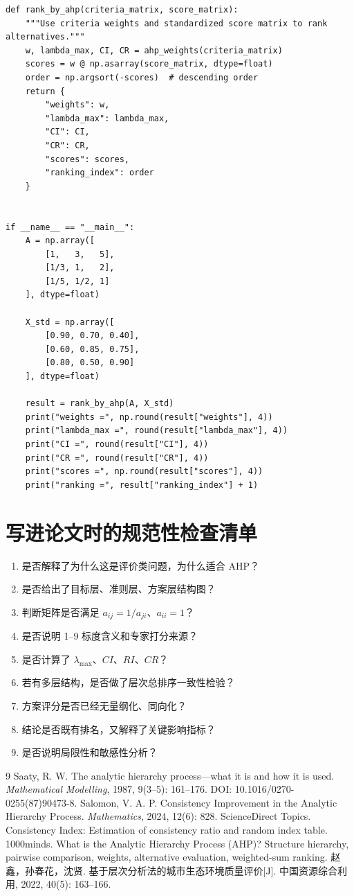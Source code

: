 \documentclass[UTF8,zihao=-4,fontset=none]{ctexart}
\begin{document}
\begin{lstlisting}
def rank_by_ahp(criteria_matrix, score_matrix):
    """Use criteria weights and standardized score matrix to rank alternatives."""
    w, lambda_max, CI, CR = ahp_weights(criteria_matrix)
    scores = w @ np.asarray(score_matrix, dtype=float)
    order = np.argsort(-scores)  # descending order
    return {
        "weights": w,
        "lambda_max": lambda_max,
        "CI": CI,
        "CR": CR,
        "scores": scores,
        "ranking_index": order
    }


if __name__ == "__main__":
    A = np.array([
        [1,   3,   5],
        [1/3, 1,   2],
        [1/5, 1/2, 1]
    ], dtype=float)

    X_std = np.array([
        [0.90, 0.70, 0.40],
        [0.60, 0.85, 0.75],
        [0.80, 0.50, 0.90]
    ], dtype=float)

    result = rank_by_ahp(A, X_std)
    print("weights =", np.round(result["weights"], 4))
    print("lambda_max =", round(result["lambda_max"], 4))
    print("CI =", round(result["CI"], 4))
    print("CR =", round(result["CR"], 4))
    print("scores =", np.round(result["scores"], 4))
    print("ranking =", result["ranking_index"] + 1)
\end{lstlisting}

\section{写进论文时的规范性检查清单}
\begin{enumerate}[leftmargin=2.2em]
  \item 是否解释了为什么这是评价类问题，为什么适合 AHP？
  \item 是否给出了目标层、准则层、方案层结构图？
  \item 判断矩阵是否满足 $a_{ij}=1/a_{ji}$、$a_{ii}=1$？
  \item 是否说明 1--9 标度含义和专家打分来源？
  \item 是否计算了 $\lambda_{\max}$、$CI$、$RI$、$CR$？
  \item 若有多层结构，是否做了层次总排序一致性检验？
  \item 方案评分是否已经无量纲化、同向化？
  \item 结论是否既有排名，又解释了关键影响指标？
  \item 是否说明局限性和敏感性分析？
\end{enumerate}

\begin{thebibliography}{9}
 Saaty, R. W. The analytic hierarchy process—what it is and how it is used. \emph{Mathematical Modelling}, 1987, 9(3--5): 161--176. DOI: 10.1016/0270-0255(87)90473-8.
 Salomon, V. A. P. Consistency Improvement in the Analytic Hierarchy Process. \emph{Mathematics}, 2024, 12(6): 828.
 ScienceDirect Topics. Consistency Index: Estimation of consistency ratio and random index table.
 1000minds. What is the Analytic Hierarchy Process (AHP)? Structure hierarchy, pairwise comparison, weights, alternative evaluation, weighted-sum ranking.
 赵鑫，孙春花，沈贤. 基于层次分析法的城市生态环境质量评价[J]. 中国资源综合利用, 2022, 40(5): 163--166.
\end{thebibliography}
\end{document}
